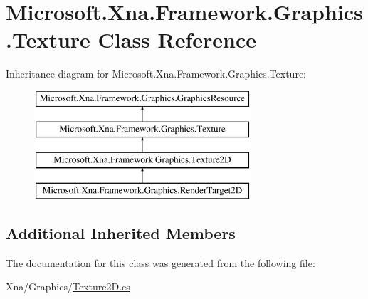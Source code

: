 \hypertarget{class_microsoft_1_1_xna_1_1_framework_1_1_graphics_1_1_texture}{}\section{Microsoft.\+Xna.\+Framework.\+Graphics.\+Texture Class Reference}
\label{class_microsoft_1_1_xna_1_1_framework_1_1_graphics_1_1_texture}
Inheritance diagram for Microsoft.\+Xna.\+Framework.\+Graphics.\+Texture\+:\begin{figure}[H]
\begin{center}
\leavevmode
\includegraphics[height=4.000000cm]{class_microsoft_1_1_xna_1_1_framework_1_1_graphics_1_1_texture}
\end{center}
\end{figure}
\subsection*{Additional Inherited Members}


The documentation for this class was generated from the following file\+:\begin{DoxyCompactItemize}
\item 
Xna/\+Graphics/\hyperlink{_texture2_d_8cs}{Texture2\+D.\+cs}\end{DoxyCompactItemize}
